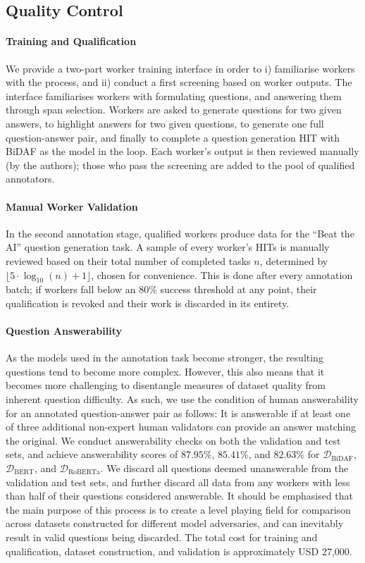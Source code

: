 \documentclass[11pt,a4paper]{article}
\newcommand{\dataset}[1]{\ensuremath{\mathcal{D_{\mathrm{#1}}}}}
\begin{document}
\subsection{Quality Control}
\paragraph{Training and Qualification}{
We provide a two-part worker training interface in order to i) familiarise workers with the process, and ii) conduct a first screening based on worker outputs.
The interface familiarises workers with formulating questions, and answering them through span selection.
Workers are asked to generate questions for two given answers, to highlight answers for two given questions, to generate one full question-answer pair, and finally to complete a question generation HIT with BiDAF as the model in the loop. 
Each worker's output is then reviewed manually (by the authors); those who pass the screening are added to the pool of qualified annotators.
}

\paragraph{Manual Worker Validation}{
In the second annotation stage, qualified workers produce data for the ``Beat the AI'' question generation task.
A sample of every worker's HITs is manually reviewed based on their total number of completed tasks $n$, determined by $\lfloor 5 \cdot \log_{10}(n) + 1 \rfloor$, chosen for convenience. 
This is done after every annotation batch; if workers fall below an $80\%$ success threshold at any point, their qualification is revoked and their work is discarded in its entirety.
}

\paragraph{Question Answerability}{
As the models used in the annotation task become stronger, the resulting questions tend to become more complex.
However, this also means that it becomes more challenging to disentangle measures of dataset quality from inherent question difficulty. 
As such, we use the condition of human answerability for an annotated question-answer pair as follows:
It is answerable if at least one of three additional non-expert human validators can provide an answer matching the original. 
We conduct answerability checks on both the validation and test sets, and achieve answerability scores of $87.95\%$, $85.41\%$, and $82.63\%$ for \dataset{BiDAF}, \dataset{BERT}, and \dataset{RoBERTa}. 
We discard all questions deemed unanswerable from the validation and test sets, and further discard all data from any workers with less than half of their questions considered answerable. 
It should be emphasised that the main purpose of this process is to create a level playing field for comparison across datasets constructed for different model adversaries, and can inevitably result in valid questions being discarded.
The total cost for training and qualification, dataset construction, and validation is approximately USD 27,000.
}
\end{document}
